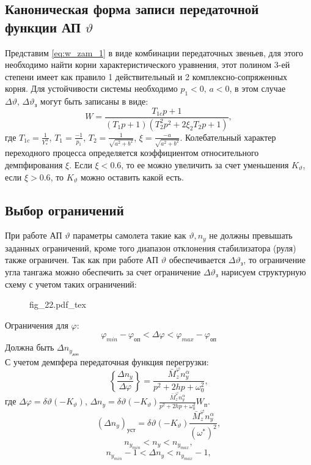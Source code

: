 \documentclass{article}
\begin{document}
\subsection{Каноническая форма записи передаточной функции АП
	\texorpdfstring{$\vartheta$}{Lg}}
Представим \ref{eq:w_zam_1} в виде комбинации передаточных звеньев, для этого
необходимо найти корни характеристического уравнения, этот полином 3-ей степени
имеет как правило 1 действительный и 2 комплексно-сопряженных корня. Для
устойчивости системы необходимо $p_1 < 0, \, a<0$, в этом случае $\Delta
	\vartheta, \, \Delta \vartheta_\text{з}$ могут быть записаны в виде:
\[
	W = \frac{T_{1c} p + 1}{(T_{1}p + 1)(T_2^2 p^2 + 2 \xi_2 T_2 p + 1)},
\]
где $T_{1c} = \frac{1}{Y_*^\alpha}$, $T_1 = \frac{-1}{p_1}$, $T_2 =
	\frac{1}{\sqrt{a^2 + b^2}}$, $\xi = \frac{-a}{\sqrt{a^2 + b^2}}$.
Колебательный характер переходного процесса определяется коэффициентом
относительного демпфирования $\xi$. Если $\xi < 0.6$, то ее можно увеличить за
счет уменьшения $K_\vartheta$, если $\xi > 0.6$, то $K_\vartheta$ можно
оставить какой есть.

\subsection{Выбор ограничений}

При работе АП $\vartheta$ параметры самолета такие как $\vartheta, n_y$ не
должны превышать заданных ограничений, кроме того диапазон отклонения
стабилизатора (руля) также ограничен. Так как при работе АП $\vartheta$
обеспечивается $\Delta \vartheta_\text{з}$, то ограничение угла тангажа можно
обеспечить за счет ограничение $\Delta \vartheta_\text{з}$ нарисуем структурную
схему с учетом таких ограничений:

\begin{figure}[H]
	\centering
	{fig_22.pdf_tex}
\end{figure}

Ограничения для $\varphi$:
\[ \varphi_{min} - \varphi_\text{оп} < \Delta \varphi < \varphi_{max} -
	\varphi_\text{оп}\]
Должна быть $\Delta n_{y_\text{доп}}$\\
С учетом демпфера передаточная функция перегрузки:
\[
	\left\{\frac{\Delta n_y}{\Delta \varphi}\right\} = \frac{\bar{M}_z^\varphi
		n_y^\alpha}{p^2 + 2hp + \omega_0^2},
\]
где $\Delta \varphi = \delta \vartheta (-K_\vartheta)$, $\Delta n_y = \delta
	\vartheta (-K_\vartheta ) \frac{\bar{M}_z^\varphi n_y^\alpha}{p^2 + 2hp +
		\omega_0^2}W_\text{п}$.
\[
	(\Delta n_y)_\text{уст} = \delta \vartheta (-
	K_\vartheta)\frac{\bar{M}_z^\varphi n_y^\alpha}{(\omega^*)^2},
\]
\[
	n_{{y}_{min}} < n_y < n_{{y}_{max}},
\]
\[
	n_{{y}_{min}} - 1< \Delta n_y < n_{{y}_{max}} - 1,
\]
\end{document}
